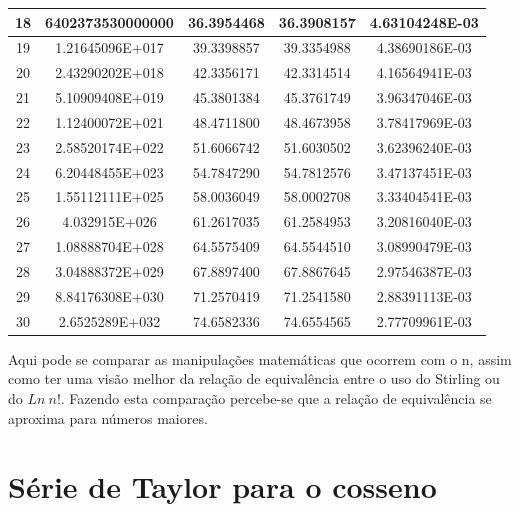 \documentclass[a4paper, 12pt]{article}
\begin{document}
\begin{table}[H]
\begin{tabular}{c|c|c|c|c}
	18 & 6402373530000000 &    36.3954468     &    36.3908157     &    4.63104248E-03 \\ \hline
	19 & 1.21645096E+017 &    39.3398857     &    39.3354988     &    4.38690186E-03 \\ \hline
	20 & 2.43290202E+018 &    42.3356171     &    42.3314514     &    4.16564941E-03 \\ \hline
	21 & 5.10909408E+019 &    45.3801384     &    45.3761749     &    3.96347046E-03 \\ \hline
	22 & 1.12400072E+021 &    48.4711800     &    48.4673958     &    3.78417969E-03 \\ \hline
	23 & 2.58520174E+022 &    51.6066742     &    51.6030502     &    3.62396240E-03 \\ \hline
	24 & 6.20448455E+023 &    54.7847290     &    54.7812576     &    3.47137451E-03 \\ \hline
	25 & 1.55112111E+025 &    58.0036049     &    58.0002708     &    3.33404541E-03 \\ \hline
	26 & 4.032915E+026 &    61.2617035     &    61.2584953     &    3.20816040E-03 \\ \hline
	27 & 1.08888704E+028 &    64.5575409     &    64.5544510     &    3.08990479E-03 \\ \hline
	28 & 3.04888372E+029 &    67.8897400     &    67.8867645     &    2.97546387E-03 \\ \hline
	29 & 8.84176308E+030 &    71.2570419     &    71.2541580     &    2.88391113E-03 \\ \hline
	30 & 2.6525289E+032 &    74.6582336     &    74.6554565     &    2.77709961E-03 \\ 
\end{tabular}
\end{table}

\hspace{1.5cm}

Aqui pode se comparar as manipulações matemáticas que ocorrem com o n, assim como ter uma visão melhor da relação de equivalência entre o uso do Stirling ou do $Ln \: n!$. Fazendo esta comparação percebe-se que a relação de equivalência se aproxima para números maiores.

\hspace{0.5cm}

\section{Série de Taylor para o cosseno}
\end{document}
